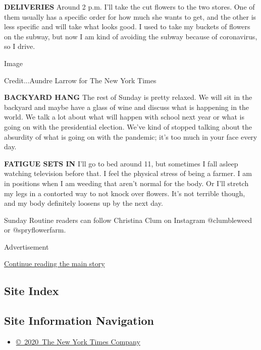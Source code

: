 \textbf{DELIVERIES} Around 2 p.m. I'll take the cut flowers to the two
stores. One of them usually has a specific order for how much she wants
to get, and the other is less specific and will take what looks good. I
used to take my buckets of flowers on the subway, but now I am kind of
avoiding the subway because of coronavirus, so I drive.

Image

Credit...Aundre Larrow for The New York Times

\textbf{BACKYARD HANG} The rest of Sunday is pretty relaxed. We will sit
in the backyard and maybe have a glass of wine and discuss what is
happening in the world. We talk a lot about what will happen with school
next year or what is going on with the presidential election. We've kind
of stopped talking about the absurdity of what is going on with the
pandemic; it's too much in your face every day.

\textbf{FATIGUE SETS IN} I'll go to bed around 11, but sometimes I fall
asleep watching television before that. I feel the physical stress of
being a farmer. I am in positions when I am weeding that aren't normal
for the body. Or I'll stretch my legs in a contorted way to not knock
over flowers. It's not terrible though, and my body definitely loosens
up by the next day.

Sunday Routine readers can follow Christina Clum on Instagram
@clumbleweed or @spryflowerfarm.

Advertisement

\protect\hyperlink{after-bottom}{Continue reading the main story}

\hypertarget{site-index}{%
\subsection{Site Index}\label{site-index}}

\hypertarget{site-information-navigation}{%
\subsection{Site Information
Navigation}\label{site-information-navigation}}

\begin{itemize}
\tightlist
\item
  \href{https://help.nytimes.com/hc/en-us/articles/115014792127-Copyright-notice}{©~2020~The
  New York Times Company}
\end{itemize}

